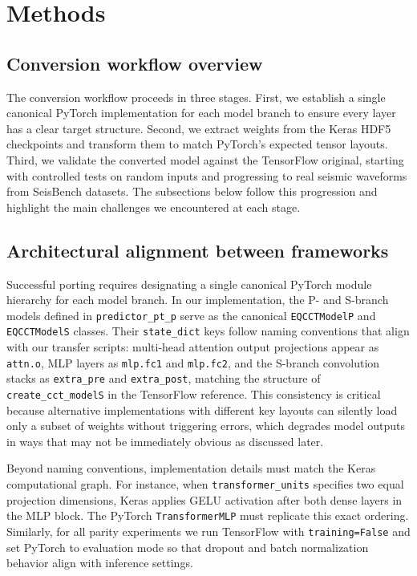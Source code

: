 \section{Methods}

\subsection{Conversion workflow overview}

The conversion workflow proceeds in three stages. First, we establish a single canonical PyTorch implementation for each model branch to ensure every layer has a clear target structure. Second, we extract weights from the Keras HDF5 checkpoints and transform them to match PyTorch's expected tensor layouts. Third, we validate the converted model against the TensorFlow original, starting with controlled tests on random inputs and progressing to real seismic waveforms from SeisBench datasets. The subsections below follow this progression and highlight the main challenges we encountered at each stage.

\subsection{Architectural alignment between frameworks}

Successful porting requires designating a single canonical PyTorch module hierarchy for each model branch. In our implementation, the P- and S-branch models defined in \texttt{predictor\_pt\_p} serve as the canonical \texttt{EQCCTModelP} and \texttt{EQCCTModelS} classes. Their \texttt{state\_dict} keys follow naming conventions that align with our transfer scripts: multi-head attention output projections appear as \texttt{attn.o}, MLP layers as \texttt{mlp.fc1} and \texttt{mlp.fc2}, and the S-branch convolution stacks as \texttt{extra\_pre} and \texttt{extra\_post}, matching the structure of \texttt{create\_cct\_modelS} in the TensorFlow reference. This consistency is critical because alternative implementations with different key layouts can silently load only a subset of weights without triggering errors, which degrades model outputs in ways that may not be immediately obvious as discussed later.

Beyond naming conventions, implementation details must match the Keras computational graph. For instance, when \texttt{transformer\_units} specifies two equal projection dimensions, Keras applies GELU activation after both dense layers in the MLP block. The PyTorch \texttt{TransformerMLP} must replicate this exact ordering. Similarly, for all parity experiments we run TensorFlow with \texttt{training=False} and set PyTorch to evaluation mode so that dropout and batch normalization behavior align with inference settings.

